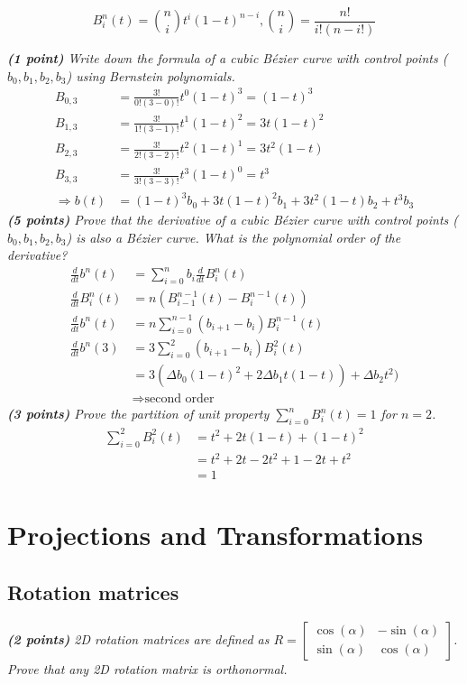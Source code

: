 \documentclass[a4paper,10pt]{article}
\begin{document}
\[B_i^n(t)=\binom{n}{i}t^i(1-t)^{n-i},\binom{n}{i}=\frac{n!}{i!(n-i!)}\]

\textit{\textbf{(1 point)} Write down the formula of a cubic Bézier curve with control points ($b_0,b_1,b_2,b_3$) using Bernstein polynomials.}\\


\[\begin{aligned} 
B_{0,3}&=\frac{3!}{0!(3-0)!}t^0(1-t)^{3}=(1-t)^{3}\\
B_{1,3}&=\frac{3!}{1!(3-1)!}t^1(1-t)^{2}=3t(1-t)^{2}\\
B_{2,3}&=\frac{3!}{2!(3-2)!}t^2(1-t)^{1}=3t^2(1-t)\\
B_{3,3}&=\frac{3!}{3!(3-3)!}t^3(1-t)^{0}=t^{3}\\
\Rightarrow b(t)&=(1-t)^3b_0+3t(1-t)^{2}b_1+3t^2(1-t)b_2+t^3b_3
\end{aligned}\]
\textit{\textbf{(5 points)} Prove that the derivative of a cubic Bézier curve with control points ($b_0,b_1,b_2,b_3$) is also a Bézier curve. What is the polynomial order of the derivative?}
\[\begin{aligned} 
\frac{d}{dt}b^n(t)&=\sum_{i=0}^nb_i\frac{d}{dt}B_i^n(t)\\
\frac{d}{dt}B_i^n(t)&=n(B_{i-1}^{n-1}(t) - B_{i}^{n-1}(t))\\
\frac{d}{dt}b^n(t)&=n\sum_{i=0}^{n-1} (b_{i+1}-b_i)B_i^{n-1}(t)\\
\frac{d}{dt}b^n(3)&=3\sum_{i=0}^{2} (b_{i+1}-b_i)B_i^{2}(t)\\
&=3(\Delta b_0(1-t)^2+ 2\Delta b_1 t (1-t)) +\Delta b_2t^2)\\
& \Rightarrow \text{second order}
\end{aligned}\]
\textit{\textbf{(3 points)} Prove the partition of unit property $\sum_{i=0}^nB_i^n(t)=1$ for $n=2$.}
\[\begin{aligned} 
\sum_{i=0}^2B_i^2(t)&=t^2+2t(1-t)+(1-t)^2\\
&=t^2+2t-2t^2+1-2t+t^2\\
&=1
\end{aligned}\]

\section{Projections and Transformations}
\subsection{Rotation matrices}
\textit{\textbf{(2 points)} 2D rotation matrices are defined as $R=\begin{bmatrix}
	\cos(\alpha)&-\sin(\alpha)\\ 
	\sin(\alpha)&\cos(\alpha)
	\end{bmatrix}$. Prove that any 2D rotation matrix is orthonormal.}\\
\end{document}
